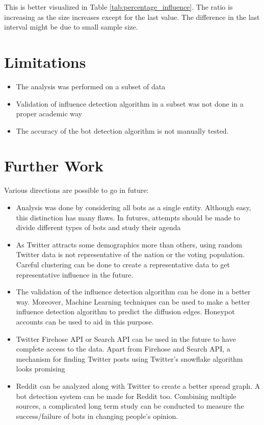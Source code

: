\documentclass[letterpaper]{article}
\begin{document}
This is better visualized in Table \ref{tab:percentage_influence}. The ratio is increasing as the size increases except for the last value. The difference in the last interval
might be due to small sample size.

\section{Limitations}
\begin{itemize}
    \item The analysis was performed on a subset of data
    \item Validation of influence detection algorithm in a subset was not done in a proper academic way
    \item The accuracy of the bot detection algorithm is not manually tested.
\end{itemize}

\section{Further Work}
Various directions are possible to go in future:

\begin{itemize}
    \item Analysis was done by considering all bots as a single entity. Although easy, this distinction has many flaws. In futures, attempts should be made to divide different types of bots and study their agenda
    \item As Twitter attracts some demographics more than others, using random Twitter data is not representative of the nation or the voting population. Careful clustering can be done to create a representative data to get representative influence in the future.
    \item The validation of the influence detection algorithm can be done in a better way. Moreover, Machine Learning techniques can be used to make a better influence detection algorithm to predict the diffusion edges.
    Honeypot accounts can be used to aid in this purpose.
    \item Twitter Firehose API or Search API can be used in the future to have complete access to the data. Apart from Firehose and Search API, 
    a mechanism for finding Twitter posts using Twitter's snowflake algorithm looks promising \cite{bettermetrics2019}
    \item Reddit can be analyzed along with Twitter to create a better spread graph. A bot detection system can be made for Reddit too. Combining multiple sources, a complicated long term study can be conducted to measure the success/failure of bots in changing people's opinion.
\end{itemize}



\end{document}
